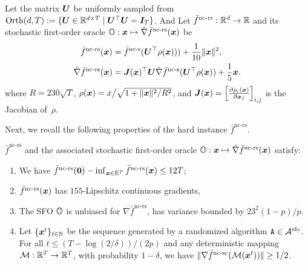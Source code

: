 \documentclass{article}
\begin{document}
\begin{dfn} \label{dfn:NC-chain-stoc-random}
Let the matrix ${\bm{U}}$ be uniformly sampled from ${\rm Orth}(d,T): = \{ {\bm{U}} \in {\mathbb{R}}^{d \times T} \mid {\bm{U}}^\top {\bm{U}}  ={\bm{I}}_T\}$. And
Let $\bar f^{\text{nc-rs}}: {\mathbb{R}}^d \rightarrow {\mathbb{R}}$ and its stochastic first-order oracle ${\mathbb{O}} : {\bm{x}} \mapsto \hat \nabla \bar f^{\text{nc-rs}}({\bm{x}})$ be 
\begin{align*}
    \bar f^{\text{nc-rs}}({\bm{x}}) &=  \bar f^{\text{nc-s}}({\bm{U}}^\top \rho({\bm{x}}))) + \frac{1}{10} \Vert {\bm{x}} \Vert^2,   \\
    \hat \nabla \bar f^{\text{nc-rs}}({\bm{x}}) &= {\bm{J}}({\bm{x}})^\top {\bm{U}} \hat \nabla \bar f^{\text{nc-s}}({\bm{U}}^\top \rho({\bm{x}})) + \frac{1}{5} {\bm{x}}. 
\end{align*}
where $R=230\sqrt{T}$, $\rho({\bm{x}}) = x \big / \sqrt{1+ \Vert {\bm{x}} \Vert^2/ R^2}$, and ${\bm{J}}({\bm{x}}) = \left[ \frac{\partial \rho_i({\bm{x}})}{\partial {\bm{x}}_j} \right]_{i,j}$ is the Jacobian of~$\rho$.
\end{dfn}

Next, we recall the following properties of the hard instance $\bar f^\text{nc-rs}$.

\begin{lem} \label{lem:Arj-random}
$\bar f^{\text{nc-rs}}$ and the associated stochastic first-order oracle ${\mathbb{O}} : {\bm{x}} \mapsto \hat \nabla \bar f^{\text{nc-rs}}({\bm{x}})$ satisfy:
\begin{enumerate}
    \item We have $\bar f^{\text{nc-rs}}({\bm{0}})-  \inf_{{\bm{x}} \in {\mathbb{R}}^T} \bar f^{\text{nc-rs}}({\bm{x}}) \le 12 T $;
    \item $\bar f^{\text{nc-rs}}({\bm{x}})$ has $155$-Lipschitz continuous gradients,
    \item The SFO ${\mathbb{O}}$ is unbiased for $\nabla \bar f^{\text{nc-rs}}$, has variance bounded by $ 23^2 (1-p)/p $.
    \item Let
     $\{{\bm{x}}^t \}_{t \in {\mathbb{N}}}$ be the sequence generated by a randomized algorithm $\texttt{A} \in {\mathcal{A}}^{{\rm sfo}}$. For all $t \le (T - \log(2/\delta))/ (2p)$ and any deterministic mapping ${\mathcal{M}}: {\mathbb{R}}^T \rightarrow {\mathbb{R}}^T$, with probability $1-\delta$, we have $\Vert \nabla \bar f^{\text{nc-sc}}({\mathcal{M}}({\bm{x}}^t)) \Vert \ge 1/2 $.
\end{enumerate}
\end{lem}

\end{document}
